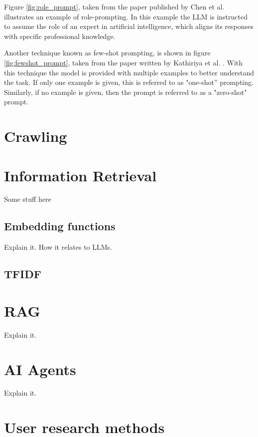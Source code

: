 Figure \ref{fig:role_prompt}, taken from the paper published by Chen et al. \cite{chen_unleashing_2023} illustrates an example of role-prompting. In this example the LLM is instructed to assume the role of an expert in artificial intelligence, which aligns its responses with specific professional knowledge.





Another technique known as few-shot prompting, is shown in figure \ref{fig:fewshot_prompt}, taken from the paper written by Kathiriya et al. \cite{kathiriya_power_2023}. With this technique the model is provided with multiple examples to better understand the task. If only one example is given, this is referred to as "one-shot” prompting. Similarly, if no example is given, then the prompt is referred to as a "zero-shot" prompt.





\section{Crawling}


\section{Information Retrieval}


Some stuff here


\subsection{Embedding functions}


Explain it. How it relates to LLMs.


\subsection{TFIDF}


\section{RAG}


Explain it.


\section{AI Agents}


Explain it.


\section{User research methods}


